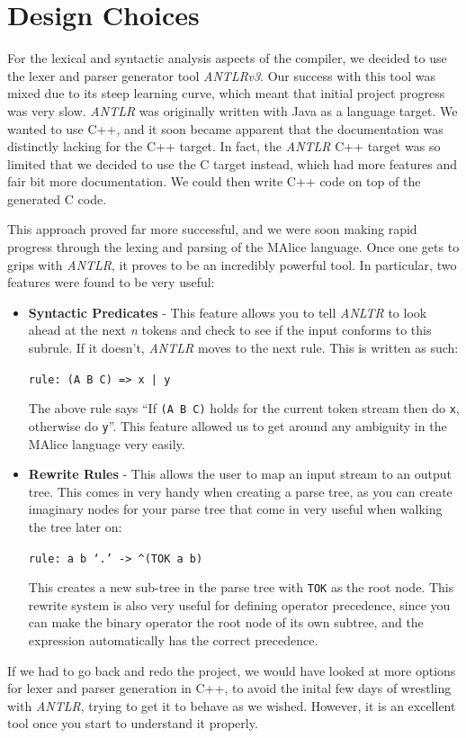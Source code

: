 \documentclass[11pt, notitlepage]{report}
\begin{document}
\section*{Design Choices}
For the lexical and syntactic analysis aspects of the compiler, we decided to use the lexer and parser generator tool \emph{ANTLRv3}. Our success with this tool was mixed due to its steep learning curve, which meant that initial project progress was very slow. \emph{ANTLR} was originally written with Java as a language target. We wanted to use C++, and it soon became apparent that the documentation was distinctly lacking for the C++ target. In fact, the \emph{ANTLR} C++ target was so limited that we decided to use the C target instead, which had more features and fair bit more documentation. We could then write C++ code on top of the generated C code.

This approach proved far more successful, and we were soon making rapid progress through the lexing and parsing of the MAlice language. Once one gets to grips with \emph{ANTLR}, it proves to be an incredibly powerful tool. In particular, two features were found to be very useful:
\begin{itemize}
\item \textbf{Syntactic Predicates} - This feature allows you to tell \emph{ANLTR} to look ahead at the next \emph{n} tokens and check to see if the input conforms to this subrule. If it doesn't, \emph{ANTLR} moves to the next rule. This is written as such:
\begin{center}
	\texttt{rule: (A B C) => x | y}
\end{center}
The above rule says ``If \texttt{(A B C)} holds for the current token stream then do \texttt{x}, otherwise do \texttt{y}''. This feature allowed us to get around any ambiguity in the MAlice language very easily.

\item \textbf{Rewrite Rules} - This allows the user to map an input stream to an output tree. This comes in very handy when creating a parse tree, as you can create imaginary nodes for your parse tree that come in very useful when walking the tree later on:
\begin{center}
	\texttt{rule: a b `.' -> \textasciicircum(TOK a b)}
\end{center}
This creates a new sub-tree in the parse tree with \texttt{TOK} as the root node. This rewrite system is also very useful for defining operator precedence, since you can make the binary operator the root node of its own subtree, and the expression automatically has the correct precedence.
\end{itemize}
If we had to go back and redo the project, we would have looked at more options for lexer and parser generation in C++, to avoid the inital few days of wrestling with \emph{ANTLR}, trying to get it to behave as we wished. However, it is an excellent tool once you start to understand it properly.
\end{document}
